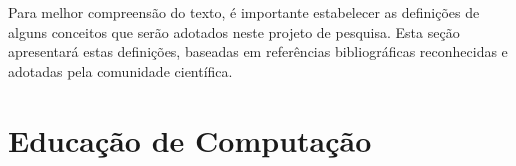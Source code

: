 Para melhor compreensão do texto, é importante estabelecer as definições de alguns conceitos que serão adotados neste projeto de pesquisa. Esta seção apresentará estas definições, baseadas em referências bibliográficas reconhecidas e adotadas pela comunidade científica.

\section{Educação de Computação}
\label{sec:EC}


